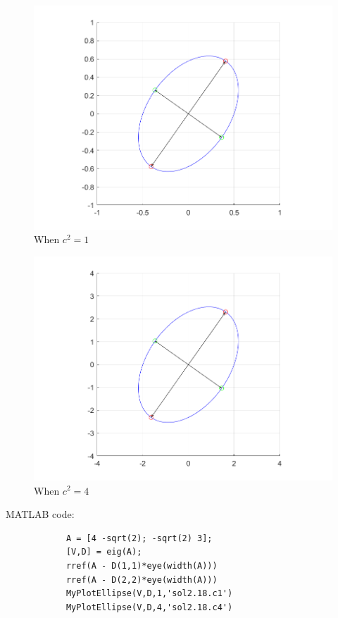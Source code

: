 \begin{enumerate}[font=\bfseries]
        \begin{figure}[H]
            \centering
            \includegraphics[scale=0.65]{./matlab/chapter-2/sol2.18.c1.png}
            \caption{When $c^2 = 1$}\label{fig:ellcis1}
        \end{figure}

        \begin{figure}[H]
            \centering
            \includegraphics[scale=0.65]{./matlab/chapter-2/sol2.18.c4.png}
            \caption{When $c^2 = 4$}\label{fig:ellcis4}
        \end{figure}

        MATLAB code:
        \begin{lstlisting}
            A = [4 -sqrt(2); -sqrt(2) 3];
            [V,D] = eig(A);
            rref(A - D(1,1)*eye(width(A)))
            rref(A - D(2,2)*eye(width(A)))
            MyPlotEllipse(V,D,1,'sol2.18.c1')
            MyPlotEllipse(V,D,4,'sol2.18.c4')
        \end{lstlisting}


\end{enumerate}
